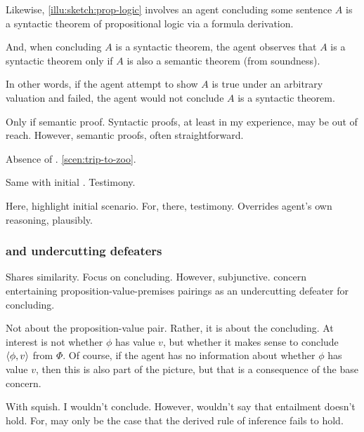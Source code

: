 \begin{note}
  Likewise, \autoref{illu:sketch:prop-logic} involves an agent concluding some sentence \(A\) is a syntactic theorem of propositional logic via a formula derivation.

  And, when concluding \(A\) is a syntactic theorem, the agent observes that \(A\) is a syntactic theorem only if \(A\) is also a semantic theorem (from soundness).

  In other words, if the agent attempt to show \(A\) is true under an arbitrary valuation and failed, the agent would not conclude \(A\) is a syntactic theorem.

  Only if semantic proof.
  Syntactic proofs, at least in my experience, may be out of reach.
  However, semantic proofs, often straightforward.
\end{note}

\begin{note}
  Absence of \requ{}.
  \autoref{scen:trip-to-zoo}.

  Same with initial .
  Testimony.
\end{note}

\begin{note}
  Here, highlight initial scenario.
  For, there, testimony.
  Overrides agent's own reasoning, plausibly.
\end{note}

\subsubsection{ and undercutting defeaters}

\begin{note}
  Shares similarity.
  Focus on concluding.
  However, subjunctive.
   concern entertaining proposition-value-premises pairings as an undercutting defeater for concluding.
\end{note}

\begin{note}
  Not about the proposition-value pair.
  Rather, it is about the concluding.
  At interest is not whether \(\phi\) has value \(v\), but whether it makes sense to conclude \(\langle \phi, v \rangle\) from \(\Phi\).
  Of course, if the agent has no information about whether \(\phi\) has value \(v\), then this is also part of the picture, but that is a consequence of the base concern.

  With squish.
  I wouldn't conclude.
  However, wouldn't say that entailment doesn't hold.
  For, may only be the case that the derived rule of inference fails to hold.
\end{note}

